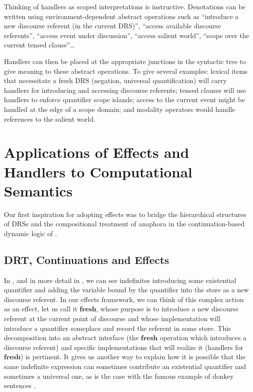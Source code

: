 \documentclass[a4paper,11pt]{easychair}
\newcommand{\effect}[1]{\textbf{#1}}
\begin{document}
Thinking of handlers as scoped interpretations is instructive. Denotations can
be written using environment-dependent abstract operations such as ``introduce
a new discourse referent (in the current DRS)'', ``access available discourse
referents'', ``access event under discussion'', ``access salient world'',
``scope over the current tensed clause''\ldots

Handlers can then be placed at the appropriate junctions in the syntactic tree
to give meaning to these abstract operations. To give several examples:
lexical items that necessitate a fresh DRS (negation, universal
quantification) will carry handlers for introducing and accessing discourse
referents; tensed clauses will use handlers to enforce quantifier scope
islands; access to the current event might be handled at the edge of a scope
domain; and modality operators would handle references to the salient world.

\section{Applications of Effects and Handlers to Computational Semantics}

Our first inspiration for adopting effects was to bridge the hierarchical
structures of DRSs and the compositional treatment of anaphora in the
continuation-based dynamic logic of \citet{de2006towards}.

\subsection{DRT, Continuations and Effects}

In \citet{de2006towards}, and in more detail in
\citet{lebedeva2012expression}, we can see indefinites introducing some
existential quantifier and adding the variable bound by the quantifier into
the store as a new discourse referent. In our effects framework, we can think
of this complex action as an effect, let us call it $\effect{fresh}$, whose
purpose is to introduce a new discourse referent at the current point of
discourse and whose implementation will introduce a quantifier someplace and
record the referent in some store. This decomposition into an abstract
interface (the $\effect{fresh}$ operation which introduces a discourse
referent) and specific implementations that will realize it (handlers for
$\effect{fresh}$) is pertinent. It gives us another way to explain how it is
possible that the same indefinite expression can sometimes contribute an
existential quantifier and sometimes a universal one, as is the case with the
famous example of donkey sentences \citep{kamp1993discourse}.
\end{document}
